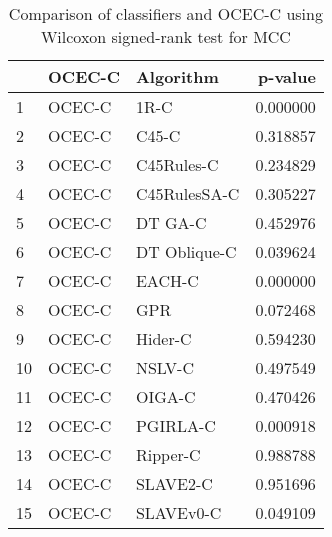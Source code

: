 \begin{table}
\footnotesize
\caption{Comparison of classifiers and OCEC-C using Wilcoxon signed-rank test for MCC}
\label{tab:OCEC-C wilcoxon MCC comparison}
\begin{tabular}{lllr}
\hline
 & OCEC-C & Algorithm & p-value \\
\hline
1 & OCEC-C & 1R-C & 0.000000 \\
2 & OCEC-C & C45-C & 0.318857 \\
3 & OCEC-C & C45Rules-C & 0.234829 \\
4 & OCEC-C & C45RulesSA-C & 0.305227 \\
5 & OCEC-C & DT GA-C & 0.452976 \\
6 & OCEC-C & DT Oblique-C & 0.039624 \\
7 & OCEC-C & EACH-C & 0.000000 \\
8 & OCEC-C & GPR & 0.072468 \\
9 & OCEC-C & Hider-C & 0.594230 \\
10 & OCEC-C & NSLV-C & 0.497549 \\
11 & OCEC-C & OIGA-C & 0.470426 \\
12 & OCEC-C & PGIRLA-C & 0.000918 \\
13 & OCEC-C & Ripper-C & 0.988788 \\
14 & OCEC-C & SLAVE2-C & 0.951696 \\
15 & OCEC-C & SLAVEv0-C & 0.049109 \\
\hline
\end{tabular}
\end{table}

